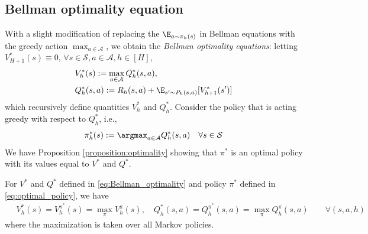 \subsection{Bellman optimality equation}
With a slight modification of replacing the $\E_{a \sim \pi_h(s)}$ in Bellman equations with the greedy action $\max_{a\in\mathcal{A}}$, we obtain the {\em Bellman optimality equations}:
letting $V^*_{H+1}(s)\equiv0$, $\forall s\in\mathcal{S},a\in\mathcal{A},h\in[H]$,
\begin{align}
\begin{split}\label{eq:Bellman_optimality}
& V_h^*(s):=\max_{a\in\mathcal{A}}  Q_h^*(s, a),\\
& Q_h^*(s, a):=R_h(s, a)+\E_{s' \sim P_h( s, a)}[V_{h+1}^*(s')]
\end{split}
\end{align}
which recursively define quantities $V^*_h$ and $Q^*_h$.
Consider the policy that is acting greedy with respect to $Q^*_h$, i.e.,
\begin{align}\label{eq:optimal_policy}
    \pi^*_h(s) := \argmax_{a\in\mathcal{A}} Q^*_h(s,a) \quad\forall s\in\mathcal{S}
\end{align}
We have Proposition \ref{proposition:optimality} showing that $\pi^*$ is an optimal policy with its values equal to $V^*$ and $Q^*$.
\begin{proposition}
\label{proposition:optimality}
For $V^*$ and $Q^*$ defined in \eqref{eq:Bellman_optimality} and policy $\pi^*$ defined in \eqref{eq:optimal_policy}, we have
\begin{align*}
    \quad V_h^*(s)=V^{\pi^*}_h(s)=\max _\pi V_h^\pi(s), \quad Q_h^*(s, a)=Q^{\pi^*}_h(s,a)=\max _\pi Q_h^\pi(s, a)
    \qquad\forall(s, a, h)
\end{align*}
where the maximization is taken over all Markov policies.
\end{proposition}
